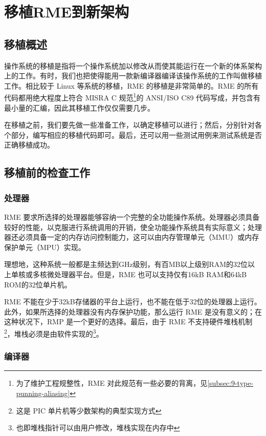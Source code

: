\chapter{移植RME到新架构}\label{ch:porting-rme-to-new-architecture}

\section{移植概述}\label{sec:7-porting-overview}

操作系统的移植是指将一个操作系统加以修改从而使其能运行在一个新的体系架构上的工作。有时，我们也把使得能用一款新编译器编译该操作系统的工作叫做移植工作。相比较于 Linux 等系统的移植，RME 的移植是非常简单的。RME 的所有代码都用绝大程度上符合 MISRA C 规范\footnote{为了维护工程规整性，RME 对此规范有一些必要的背离，见\ref{subsec:9-type-punning-aliasing}}的 ANSI/ISO C89 代码写成，并包含有最小量的汇编，因此其移植工作仅仅需要几步。

在移植之前，我们要先做一些准备工作，以确定移植可以进行；然后，分别针对各个部分，编写相应的移植代码即可。最后，还可以用一些测试用例来测试系统是否正确移植成功。

\section{移植前的检查工作}\label{sec:7-pre-porting-checks}

\subsection{处理器}\label{subsec:7-processor}

RME 要求所选择的处理器能够容纳一个完整的全功能操作系统。处理器必须具备较好的性能，以克服进行系统调用的开销，使全功能操作系统具有实际意义；处理器还必须具备一定的内存访问控制能力，这可以由内存管理单元（MMU）或内存保护单元（MPU）实现。

理想地，这种系统一般都是主频达到GHz级别，有百MB以上级别RAM的32位以上单核或多核微处理器平台。但是，RME 也可以支持仅有16kB
RAM和64kB ROM的32位单片机。

RME 不能在少于32kB存储器的平台上运行，也不能在低于32位的处理器上运行。此外，如果所选择的处理器没有内存保护功能，那么运行 RME 是没有意义的；在这种状况下，RMP 是一个更好的选择。最后，由于 RME 不支持硬件堆栈机制\footnote{这是 PIC 单片机等少数架构的典型实现方式}，堆栈必须是由软件实现的\footnote{也即堆栈指针可以由用户修改，堆栈实现在内存中}。

\subsection{编译器}\label{subsec:7-compiler}

